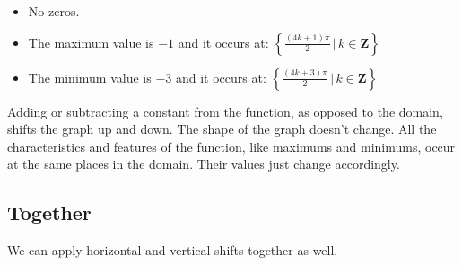 \documentclass{ximera}
\begin{document}
\begin{example}
\begin{image}
\end{image}



\begin{itemize}
\item No zeros.
\item The maximum value is $-1$ and it occurs at:  $\left\{     \frac{(4k+1)\pi}{2} \, | \, k \in \textbf{Z}     \right\}$
\item The minimum value is $-3$ and it occurs at:  $\left\{    \frac{(4k+3)\pi}{2} \, | \, k \in \textbf{Z}     \right\}$
\end{itemize}














\end{example}






Adding or subtracting a constant from the function, as opposed to the domain, shifts the graph up and down.  The shape of the graph doesn't change.  All the characteristics and features of the function, like maximums and minimums, occur at the same places in the domain.  Their values just change accordingly.



























\subsection*{Together}

We can apply horizontal and vertical shifts together as well.
\end{document}
